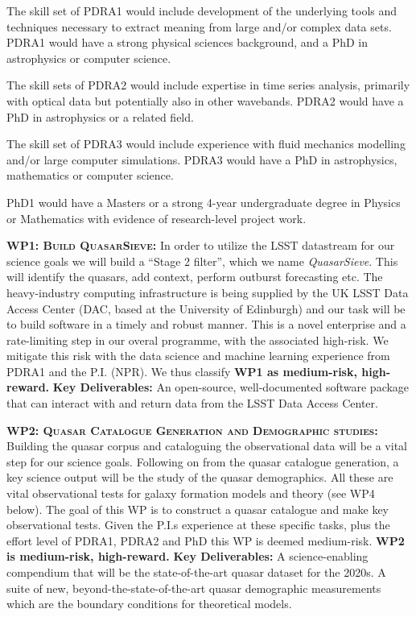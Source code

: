\documentclass[oneside, a4paper, onecolumn, 11pt]{article}
\begin{document}
\smallskip
\smallskip
\noindent
The skill set of PDRA1 would include development of the underlying
tools and techniques necessary to extract meaning from large and/or
complex data sets.  PDRA1 would have a strong physical sciences
background, and a PhD in astrophysics or computer science.

\smallskip
\smallskip
\noindent
The skill sets of PDRA2 would include expertise in time series
analysis, primarily with optical data but potentially also in other
wavebands.  PDRA2 would have a PhD in astrophysics or a related field.

\smallskip
\smallskip
\noindent
The skill set of PDRA3 would include experience with fluid mechanics
modelling and/or large computer simulations.  PDRA3 would have a PhD in astrophysics,
mathematics or computer science.

\smallskip
\smallskip
\noindent
PhD1 would have a Masters or a strong 4-year undergraduate degree in
Physics or Mathematics with evidence of research-level project work.


\smallskip
\smallskip
\noindent
\textbf{\textsc{WP1: Build QuasarSieve:}} 
In order to utilize the LSST datastream for our science goals we will
build a ``Stage 2 filter'', which we name {\it QuasarSieve}.  This
will identify the quasars, add context, perform outburst forecasting
etc.  
The heavy-industry computing infrastructure is being
supplied by the UK LSST Data Access Center (DAC, based at the
University of Edinburgh) and our task will be to build software in a
timely and robust manner.  This is a novel enterprise and a
rate-limiting step in our overal programme, with the associated
high-risk.  We mitigate this risk with the data science and machine
learning experience from PDRA1 and the P.I. (NPR).  We thus classify
{\bf WP1 as medium-risk, high-reward.}  {\bf Key Deliverables:} An
open-source, well-documented software package that can interact with
and return data from the LSST Data Access Center.


\smallskip
\smallskip
\noindent
\textbf{\textsc{WP2: Quasar Catalogue Generation and Demographic studies:}}  
Building the quasar corpus and cataloguing the observational data will
be a vital step for our science goals.  Following on from the quasar
catalogue generation, a key science output will be the study of the
quasar demographics.  All these are vital observational tests for
galaxy formation models and theory (see WP4 below). The goal of this
WP is to construct a quasar catalogue and make key observational
tests.  Given the P.I.s experience at these specific tasks, plus the
effort level of PDRA1, PDRA2 and PhD this WP is deemed medium-risk.
{\bf WP2 is medium-risk, high-reward.}  {\bf Key Deliverables:} A
science-enabling compendium that will be the state-of-the-art quasar
dataset for the 2020s.  A suite of new, beyond-the-state-of-the-art
quasar demographic measurements which are the boundary conditions for
theoretical models.
\end{document}
